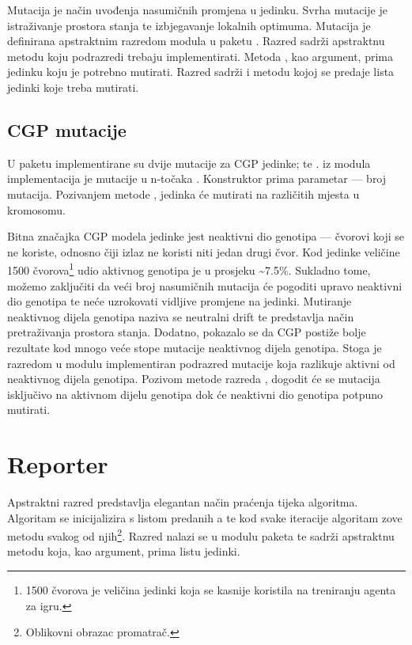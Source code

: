 \documentclass[times, utf8, zavrsni, numeric]{fer}
\begin{document}
Mutacija  je način uvođenja nasumičnih promjena u jedinku. Svrha
mutacije je istraživanje prostora stanja te izbjegavanje lokalnih
optimuma.\citep{domovic-vizualizacija} Mutacija je definirana apstraktnim
razredom  modula  u paketu .
Razred  sadrži apstraktnu metodu  koju
podrazredi trebaju implementirati. Metoda , kao argument, prima
jedinku koju je potrebno mutirati. Razred  sadrži i metodu
 kojoj se predaje lista jedinki koje treba mutirati.

\subsection{CGP mutacije}
U paketu  implementirane su dvije mutacije za CGP jedinke;
 te .  iz
modula  implementacija je mutacije u n-točaka
. Konstruktor prima parametar  --- broj
mutacija. Pozivanjem metode , jedinka će mutirati na 
različitih mjesta u kromosomu.

Bitna značajka CGP modela jedinke jest neaktivni dio genotipa --- čvorovi koji
se ne koriste, odnosno čiji izlaz ne koristi niti jedan drugi čvor. Kod jedinke
veličine 1500 čvorova\footnote{1500 čvorova je veličina jedinki koja se kasnije
koristila na treniranju agenta za igru.} udio aktivnog genotipa je u prosjeku
\textasciitilde7.5\%.\citep{miller2006redundancy} Sukladno tome, možemo
zaključiti da veći broj nasumičnih mutacija će pogoditi upravo neaktivni dio
genotipa te neće uzrokovati vidljive promjene na jedinki.  Mutiranje neaktivnog
dijela genotipa naziva se neutralni drift  te predstavlja
način pretraživanja prostora stanja.\citep{miller2011cartesian} Dodatno,
pokazalo se da CGP postiže bolje rezultate kod mnogo veće stope mutacije
neaktivnog dijela genotipa.\citep{pedroniexplicitly} Stoga je razredom
 u modulu  implementiran
podrazred mutacije  koja razlikuje aktivni od neaktivnog
dijela genotipa. Pozivom metode  razreda
, dogodit će se  mutacija isključivo na
aktivnom dijelu genotipa dok će neaktivni dio genotipa potpuno mutirati.


\section{Reporter}
Apstraktni razred  predstavlja elegantan način praćenja tijeka
algoritma. Algoritam se inicijalizira s listom predanih a te
kod svake iteracije algoritam zove metodu  svakog od
njih\footnote{Oblikovni obrazac promatrač.}. Razred  nalazi se
u modulu  paketa  te sadrži apstraktnu metodu
 koja, kao argument, prima listu jedinki.
\end{document}
